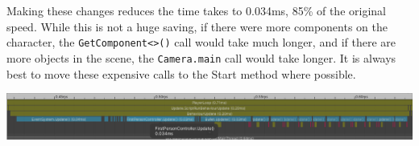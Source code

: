 \documentclass{article}
\begin{document}
Making these changes reduces the time takes to 0.034ms, 85\% of the original speed. While this is not a huge saving, if there were more components on the character, the \lstinline[basicstyle=\footnotesize]{GetComponent<>()} call would take much longer, and if there are more objects in the scene, the \lstinline[basicstyle=\footnotesize]{Camera.main} call would take longer. It is always best to move these expensive calls to the Start method where possible.
\begin{center}
    \includegraphics[width=\textwidth]{Images/ControllerFixed.png}
\end{center}
\end{document}
